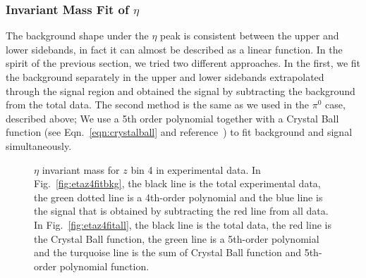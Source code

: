 \subsubsection{\texorpdfstring{Invariant Mass Fit of $\eta$}{eta fit} }
\label{sec:etafitsection}
The background shape under the $\eta$ peak is consistent between the upper and lower sidebands, in fact it can almost be described as a linear function. In the spirit of the previous section, we tried two different approaches. 
In the first, we fit the background separately in the upper and lower sidebands 
extrapolated through the signal region and obtained the signal by subtracting the background from the total data. The second method is the same as we used in the $\pi^0$ case, described above; We use a 5th order polynomial together with a Crystal Ball function (see Eqn.~\ref{eqn:crystalball} and reference~\cite{CrystalBallFunc}) to fit background and signal simultaneously. 


\begin{figure}[h]
\centering     %
{}
\caption{$\eta$ invariant mass for $z$ bin 4 in experimental data. In Fig.~\ref{fig:etaz4fitbkg}, the black line is the total experimental data, the green dotted line is a 4th-order polynomial and the blue line is the signal that is obtained by subtracting the red line from all data. In Fig.~\ref{fig:etaz4fitall}, the black line is the total data, the red line is the Crystal Ball function, the green line is a 5th-order polynomial and the turquoise line is the sum of Crystal Ball function and 5th-order polynomial function.}
\label{fig:eta_fit}
\end{figure}


